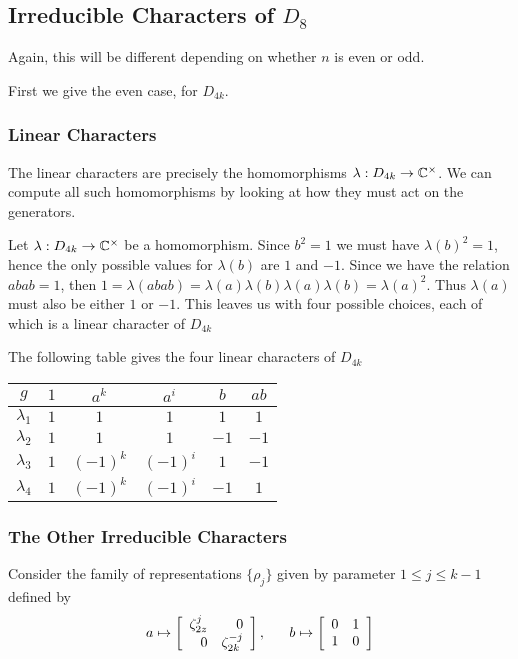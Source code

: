 \subsection{Irreducible Characters of $D_8$}

Again, this will be different depending on whether $n$ is even or odd. 

First we give the even case, for $D_{4k}$.

\subsubsection{Linear Characters}
The linear characters are precisely the homomorphisms $\lambda : D_{4k} \rightarrow \mathbb{C}^\times$. We can compute all 
such homomorphisms by looking at how they must act on the generators. 

Let $\lambda : D_{4k} \rightarrow \mathbb{C}^\times$ be a homomorphism. Since $b^2 = 1$ we must have $\lambda(b)^2 = 1$, 
hence the only possible values for $\lambda(b)$ are $1$ and $-1$. Since we have the relation $abab = 1$, then $1 = 
\lambda(abab) = \lambda(a)\lambda(b)\lambda(a)\lambda(b) = \lambda(a)^2$. Thus $\lambda(a)$ must also be either $1$ 
or $-1$. This leaves us with four possible choices, each of which is a linear character of $D_{4k}$

The following table gives the four linear characters of $D_{4k}$
\begin{center}
\begin{tabular}{c|ccccc}
    $g$ &$1$ & $a^k$ & $a^i$ & $b$ & $ab$ \\ \hline
    $\lambda_1$ & $1$ & $1$ & $1$ & $1$ & $1$ \\
    $\lambda_2$ & $1$ & $1$ & $1$ & $-1$ & $-1$ \\
    $\lambda_3$ & $1$ & $(-1)^k$ & $(-1)^i$ & $1$ & $-1$ \\
    $\lambda_4$ & $1$ & $(-1)^k$ & $(-1)^i$ & $-1$ & $1$ \\
\end{tabular}
\end{center}

\subsubsection{The Other Irreducible Characters}
Consider the family of representations $\{\rho_j\}$ given by parameter $1 \leq j \leq k-1$ defined by
\[
    a \mapsto \left[\begin{array}{rr}\zeta_{2z}^j&0\\0&\zeta_{2k}^{-j}\end{array}\right], \quad \ \ b \mapsto \left[\begin{array}{rr}0&1\\1&0\end{array}\right]
\]

